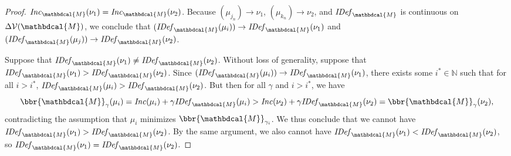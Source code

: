 \documentclass[letterpaper]{article} %
\theoremstyle{plain}
\theoremstyle{definition}
\theoremstyle{remark}
\newcommand{\V}{\mathcal V}
\newcommand{\dg}[1]{\mathbdcal{#1}}
\newcommand{\IDef}[1]{\mathit{IDef}_{#1}}
\newcommand\Inc{\mathit{Inc}}
\begin{document}
\begin{proof}
$\Inc_{\dg M}(\nu_1) = \Inc_{\dg M}(\nu_2)$.  
Because  $(\mu_{j_n}) \to \nu_1$, $(\mu_{k_n}) \to \nu_2$, and
$\IDef{\dg M}$ is
continuous on $\Delta\V(\dg M)$,
we conclude that  
$(\IDef{\dg M}(\mu_{i}))\to \IDef{\dg M}(\nu_1)$ and
$(\IDef{\dg M}(\mu_{j}))\to \IDef{\dg M}(\nu_2)$.

Suppose that $\IDef{\dg
M}(\nu_1) \neq \IDef{\dg M}(\nu_2)$. Without loss of generality,
suppose that $\IDef{\dg M}(\nu_1) > \IDef{\dg M}(\nu_2)$. 
Since $(\IDef{\dg M}(\mu_{i})) \to \IDef{\dg M}(\nu_1)$, there exists some $i^*
\in \mathbb N$ such that for all $i > i^*$,  
$ \IDef{\dg M}(\mu_{i}) >  \IDef{\dg M}(\nu_2) $.
But then for all $\gamma$ and $i > i^*$, we have 
\[ \bbr{\dg M}_\gamma(\mu_i) = \Inc(\mu_i) + \gamma\IDef{\dg M}(\mu_i)
> \Inc(\nu_2)  
+ \gamma \IDef{\dg M}(\nu_2) = \bbr{\dg M}_\gamma(\nu_2),\]
contradicting the assumption that $\mu_{i}$ minimizes
$\bbr{\dg M}_{\gamma_{i}}$. We thus conclude that we
cannot have $\IDef{\dg M}(\nu_1) > \IDef{\dg M}(\nu_2)$.  By the same
argument, we also cannot have $\IDef{\dg M}(\nu_1) < \IDef{\dg
  M}(\nu_2)$, so $\IDef{\dg M}(\nu_1) =\IDef{\dg M}(\nu_2)$.  
  

\end{proof}
\end{document}
